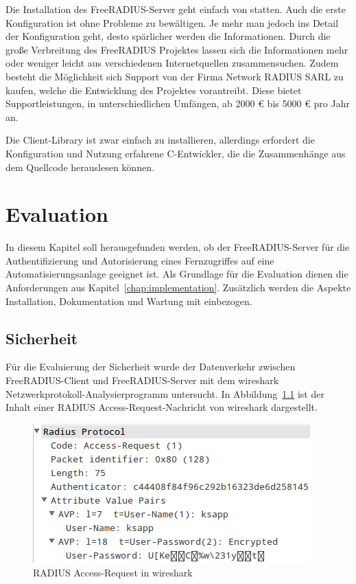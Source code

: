 \documentclass[11pt,a4paper]{report}
\begin{document}
Die Installation des FreeRADIUS-Server geht einfach von statten. Auch die erste Konfiguration ist ohne Probleme zu bewältigen. Je mehr man jedoch ins Detail der Konfiguration geht, desto spärlicher werden die Informationen. Durch die große Verbreitung des FreeRADIUS Projektes lassen sich die Informationen mehr oder weniger leicht aus verschiedenen Internetquellen zusammensuchen. Zudem besteht die Möglichkeit sich Support von der Firma Network RADIUS SARL zu kaufen, welche die Entwicklung des Projektes vorantreibt. Diese bietet Supportleistungen, in unterschiedlichen Umfängen, ab 2000 € bis 5000 € pro Jahr an.

Die Client-Library ist zwar einfach zu installieren, allerdings erfordert die Konfiguration und Nutzung erfahrene C-Entwickler, die die Zusammenhänge aus dem Quellcode herauslesen können. 

\chapter{Evaluation} \label{chap:evaluation}

In diesem Kapitel soll herausgefunden werden, ob der FreeRADIUS-Server für die Authentifizierung und Autorisierung eines Fernzugriffes auf eine Automatisierungsanlage geeignet ist. Als Grundlage für die Evaluation dienen die Anforderungen aus Kapitel~\ref{chap:implementation}. Zusätzlich werden die Aspekte Installation, Dokumentation und Wartung mit einbezogen.

\section{Sicherheit}

Für die Evaluierung der Sicherheit wurde der Datenverkehr zwischen FreeRADIUS-Client und FreeRADIUS-Server mit dem wireshark Netzwerkprotokoll-Analysierprogramm untersucht. In Abbildung~\ref{fig:radius_wire} ist der Inhalt einer RADIUS Access-Request-Nachricht von wireshark dargestellt.

\begin{figure}[htbp]
\centering
\includegraphics[scale=1]{images/radius_request_wireshark.png}
\caption{RADIUS Access-Request in wireshark}
\label{fig:radius_wire}
\end{figure}
\end{document}
